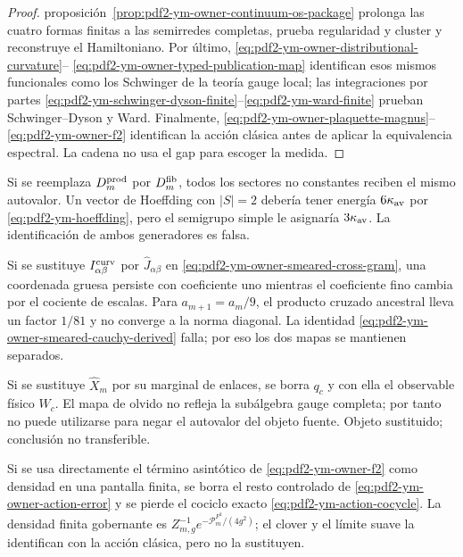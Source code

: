 \begin{proof}
proposición~\ref{prop:pdf2-ym-owner-continuum-os-package} prolonga las
cuatro formas finitas a las
semirredes completas, prueba regularidad y cluster y reconstruye el Hamiltoniano. Por
último, \eqref{eq:pdf2-ym-owner-distributional-curvature}--
\eqref{eq:pdf2-ym-owner-typed-publication-map} identifican esos mismos funcionales
como los Schwinger de la teoría gauge local; las integraciones por partes
\eqref{eq:pdf2-ym-schwinger-dyson-finite}--\eqref{eq:pdf2-ym-ward-finite} prueban
Schwinger--Dyson y Ward. Finalmente,
\eqref{eq:pdf2-ym-owner-plaquette-magnus}--\eqref{eq:pdf2-ym-owner-f2} identifican
la acción clásica antes de aplicar la equivalencia espectral. La cadena no usa el
gap para escoger la medida.
\end{proof}

\begin{falsifier}
Si se reemplaza $D_m^{\rm prod}$ por $D_m^{\rm fib}$, todos los sectores no
constantes reciben el mismo autovalor. Un vector de Hoeffding con $|S|=2$ debería
tener energía $6\kappa_{\rm av}$ por \eqref{eq:pdf2-ym-hoeffding}, pero el
semigrupo simple le asignaría $3\kappa_{\rm av}$. La identificación de ambos
generadores es falsa.
\end{falsifier}

\begin{falsifier}
Si se sustituye $I_{\alpha\beta}^{\rm curv}$ por
$\widehat J_{\alpha\beta}$ en
\eqref{eq:pdf2-ym-owner-smeared-cross-gram}, una coordenada gruesa persiste con
coeficiente uno mientras el coeficiente fino cambia por el cociente de escalas. Para
$a_{m+1}=a_m/9$, el producto cruzado ancestral lleva un factor $1/81$ y no converge
a la norma diagonal. La identidad
\eqref{eq:pdf2-ym-owner-smeared-cauchy-derived} falla; por eso los dos mapas se
mantienen separados.
\end{falsifier}

\begin{falsifier}
Si se sustituye $\widehat X_m$ por su marginal de enlaces, se borra $q_c$ y con ella
el observable físico $W_c$. El mapa de olvido no refleja la subálgebra gauge completa;
por tanto no puede utilizarse para negar el autovalor del objeto fuente. Objeto
sustituido; conclusión no transferible.
\end{falsifier}

\begin{falsifier}
Si se usa directamente el término asintótico de
\eqref{eq:pdf2-ym-owner-f2} como densidad en una pantalla finita, se borra el resto
controlado de \eqref{eq:pdf2-ym-owner-action-error} y se pierde el cociclo exacto
\eqref{eq:pdf2-ym-action-cocycle}. La densidad finita gobernante es
$Z_{m,g}^{-1}e^{-\mathcal P_m^{F^2}/(4g^2)}$; el clover y el límite suave la
identifican con la acción clásica, pero no la sustituyen.
\end{falsifier}

